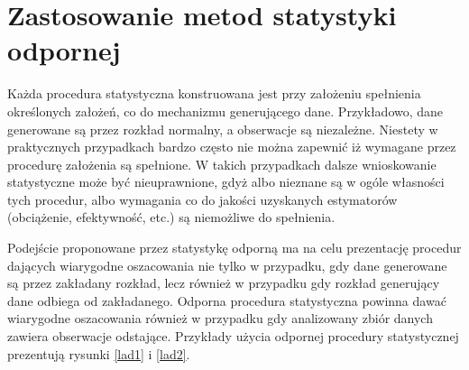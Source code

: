 \documentclass[a4paper,12pt,openany, DIV=calc, headsepline]{scrbook}
\begin{document}
\section{Zastosowanie metod statystyki odpornej}

Każda procedura statystyczna konstruowana jest przy założeniu spełnienia określonych założeń, co do mechanizmu generującego dane. Przykładowo, dane generowane są przez rozkład normalny, a obserwacje są niezależne. Niestety w praktycznych przypadkach bardzo często nie można zapewnić iż wymagane przez procedurę założenia są spełnione. W takich przypadkach dalsze wnioskowanie statystyczne może być nieuprawnione, gdyż albo nieznane są w ogóle własności tych procedur, albo wymagania co do jakości uzyskanych estymatorów (obciążenie, efektywność, etc.) są niemożliwe do spełnienia.

Podejście proponowane przez statystykę odporną ma na celu prezentację procedur dających wiarygodne oszacowania nie tylko w przypadku, gdy dane generowane są przez zakładany rozkład, lecz również w przypadku gdy rozkład generujący dane odbiega od zakładanego. Odporna procedura statystyczna powinna dawać wiarygodne oszacowania również w przypadku gdy analizowany zbiór danych zawiera obserwacje odstające\citep{Van:2000}. Przykłady użycia odpornej procedury statystycznej prezentują rysunki \ref{lad1} i \ref{lad2}.
\end{document}
